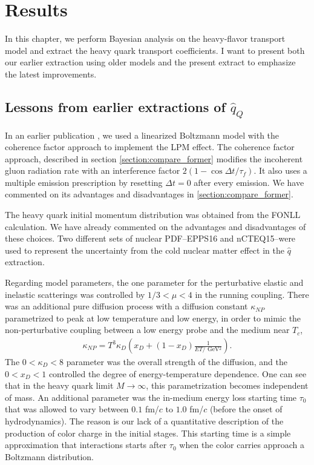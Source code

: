\chapter{Results}
\label{chapter:results}
In this chapter, we perform Bayesian analysis on the heavy-flavor transport model and extract the heavy quark transport coefficients.
I want to present both our earlier extraction using older models and the present extract to emphasize the latest improvements.

\section{Lessons from earlier extractions of $\hat{q}_Q$}
In an earlier publication \cite{Ke:2018tsh}, we used a linearized Boltzmann model with the coherence factor approach to implement the LPM effect.
The coherence factor approach, described in section  \ref{section:compare_former} modifies the incoherent gluon radiation rate with an interference factor $2(1-\cos\Delta t/\tau_f)$. 
It also uses a multiple emission prescription by resetting $\Delta t=0$ after every emission.
We have commented on its advantages and disadvantages in \ref{section:compare_former}.

The heavy quark initial momentum distribution was obtained from the FONLL calculation.
We have already commented on the advantages and disadvantages of these choices.
Two different sets of nuclear PDF--EPPS16 \cite{Eskola:2016oht} and nCTEQ15\cite{Kovarik:2015cma}--were used to represent the uncertainty from the cold nuclear matter effect in the $\hat{q}$ extraction.

Regarding model parameters, the one parameter for the perturbative elastic and inelastic scatterings was controlled by $1/3 < \mu < 4$ in the running coupling. 
There was an additional pure diffusion process with a diffusion constant $\kappa_{NP}$ parametrized to peak at low temperature and low energy, in order to mimic the non-perturbative coupling between a low energy probe and the medium near $T_c$,
\begin{eqnarray}
\kappa_{NP} = T^3 \kappa_D \left(x_D + (1-x_D)\frac{1}{ET/\textrm{ GeV}{}^2}\right).
\end{eqnarray}
The $0<\kappa_D<8$ parameter was the overall strength of the diffusion, and the $0<x_D<1$ controlled the degree of energy-temperature dependence.
One can see that in the heavy quark limit $M\rightarrow \infty$, this parametrization becomes independent of mass.
An additional parameter was the in-medium energy loss starting time $\tau_0$ that was allowed to vary between $0.1$ fm/$c$ to $1.0$ fm/$c$ (before the onset of hydrodynamics).
The reason is our lack of a quantitative description of the production of color charge in the initial stages.
This starting time is a simple approximation that interactions starts after $\tau_0$ when the color carries approach a Boltzmann distribution.

